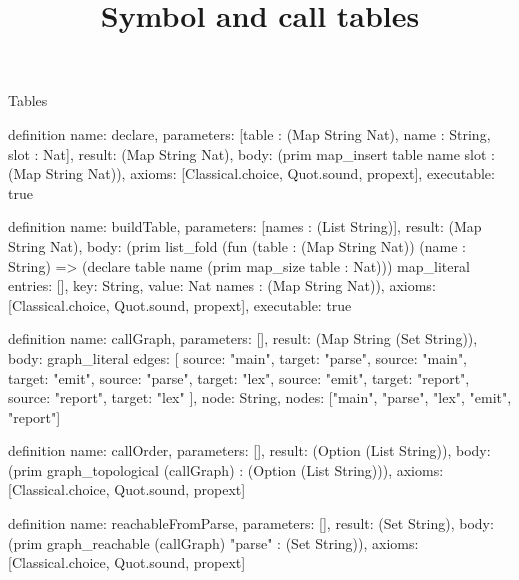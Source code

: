 \begin{lexlean}{Tables}
\title{Symbol and call tables}
\begin{semanticmodule}
definition{
  name: declare,
  parameters: [table : (Map String Nat), name : String, slot : Nat],
  result: (Map String Nat),
  body: (prim map_insert table name slot : (Map String Nat)),
  axioms: [Classical.choice, Quot.sound, propext],
  executable: true
}

definition{
  name: buildTable,
  parameters: [names : (List String)],
  result: (Map String Nat),
  body: (prim list_fold (fun (table : (Map String Nat)) (name : String) => (declare table name (prim map_size table : Nat))) map_literal{
    entries: [],
    key: String,
    value: Nat
  } names : (Map String Nat)),
  axioms: [Classical.choice, Quot.sound, propext],
  executable: true
}

definition{
  name: callGraph,
  parameters: [],
  result: (Map String (Set String)),
  body: graph_literal{
    edges: [
      {source: "main", target: "parse"},
      {source: "main", target: "emit"},
      {source: "parse", target: "lex"},
      {source: "emit", target: "report"},
      {source: "report", target: "lex"}
    ],
    node: String,
    nodes: ["main", "parse", "lex", "emit", "report"]
  }
}

definition{
  name: callOrder,
  parameters: [],
  result: (Option (List String)),
  body: (prim graph_topological (callGraph) : (Option (List String))),
  axioms: [Classical.choice, Quot.sound, propext]
}

definition{
  name: reachableFromParse,
  parameters: [],
  result: (Set String),
  body: (prim graph_reachable (callGraph) "parse" : (Set String)),
  axioms: [Classical.choice, Quot.sound, propext]
}
\end{semanticmodule}
\end{lexlean}
